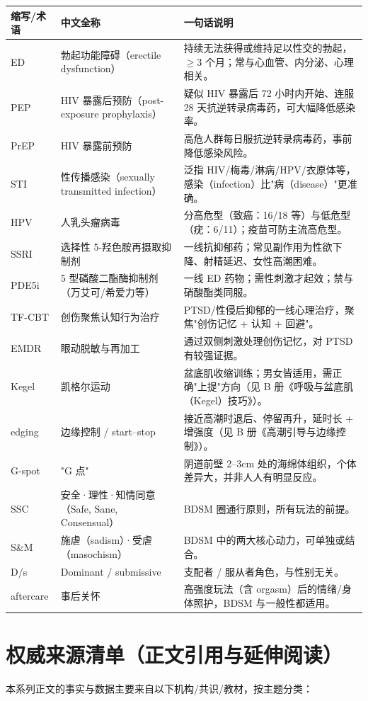 \begin{tabularx}{\textwidth}{l X X}
\toprule
\textbf{缩写/术语} & \textbf{中文全称} & \textbf{一句话说明} \\
\midrule
ED & 勃起功能障碍（erectile dysfunction） & 持续无法获得或维持足以性交的勃起，$\ge$3 个月；常与心血管、内分泌、心理相关。 \\
PEP & HIV 暴露后预防（post-exposure prophylaxis） & 疑似 HIV 暴露后 72 小时内开始、连服 28 天抗逆转录病毒药，可大幅降低感染率。 \\
PrEP & HIV 暴露前预防 & 高危人群每日服抗逆转录病毒药，事前降低感染风险。 \\
STI & 性传播感染（sexually transmitted infection） & 泛指 HIV/梅毒/淋病/HPV/衣原体等，感染（infection）比"病（disease）"更准确。 \\
HPV & 人乳头瘤病毒 & 分高危型（致癌：16/18 等）与低危型（疣：6/11）；疫苗可防主流高危型。 \\
SSRI & 选择性 5-羟色胺再摄取抑制剂 & 一线抗抑郁药；常见副作用为性欲下降、射精延迟、女性高潮困难。 \\
PDE5i & 5 型磷酸二酯酶抑制剂（万艾可/希爱力等） & 一线 ED 药物；需性刺激才起效；禁与硝酸酯类同服。 \\
TF-CBT & 创伤聚焦认知行为治疗 & PTSD/性侵后抑郁的一线心理治疗，聚焦"创伤记忆 + 认知 + 回避"。 \\
EMDR & 眼动脱敏与再加工 & 通过双侧刺激处理创伤记忆，对 PTSD 有较强证据。 \\
Kegel & 凯格尔运动 & 盆底肌收缩训练；男女皆适用，需正确"上提"方向（见 B 册《呼吸与盆底肌（Kegel）技巧》）。 \\
edging & 边缘控制 / start--stop & 接近高潮时退后、停留再升，延时长 + 增强度（见 B 册《高潮引导与边缘控制》）。 \\
G-spot & "G 点" & 阴道前壁 2--3cm 处的海绵体组织，个体差异大，并非人人有明显反应。 \\
SSC & 安全·理性·知情同意（Safe, Sane, Consensual） & BDSM 圈通行原则，所有玩法的前提。 \\
S\&M & 施虐（sadism）·受虐（masochism） & BDSM 中的两大核心动力，可单独或结合。 \\
D/s & Dominant / submissive & 支配者 / 服从者角色，与性别无关。 \\
aftercare & 事后关怀 & 高强度玩法（含 orgasm）后的情绪/身体照护，BDSM 与一般性都适用。 \\
\bottomrule
\end{tabularx}

\section{权威来源清单（正文引用与延伸阅读）}
本系列正文的事实与数据主要来自以下机构/共识/教材，按主题分类：

